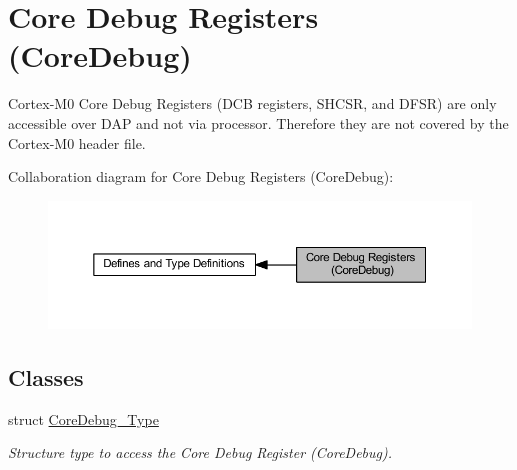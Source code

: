 \hypertarget{group___c_m_s_i_s___core_debug}{}\section{Core Debug Registers (Core\+Debug)}
\label{group___c_m_s_i_s___core_debug}


Cortex-\/\+M0 Core Debug Registers (D\+CB registers, S\+H\+C\+SR, and D\+F\+SR) are only accessible over D\+AP and not via processor. Therefore they are not covered by the Cortex-\/\+M0 header file.  


Collaboration diagram for Core Debug Registers (Core\+Debug)\+:
\nopagebreak
\begin{figure}[H]
\begin{center}
\leavevmode
\includegraphics[width=350pt]{group___c_m_s_i_s___core_debug}
\end{center}
\end{figure}
\subsection*{Classes}
\begin{DoxyCompactItemize}
\item 
struct \hyperlink{struct_core_debug___type}{Core\+Debug\+\_\+\+Type}
\begin{DoxyCompactList}\small\item\em Structure type to access the Core Debug Register (Core\+Debug). \end{DoxyCompactList}\end{DoxyCompactItemize}
